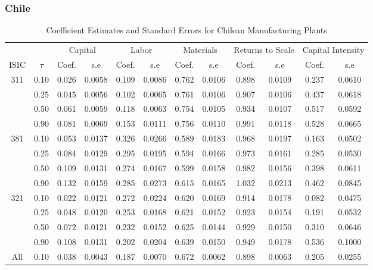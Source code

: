 \documentclass[11pt]{article}
\begin{document}
\subsubsection{Chile}

\begin{table}[H]
\centering
\caption{Coefficient Estimates and Standard Errors for Chilean Manufacturing Plants}
\begin{tabular}{cccccccccccc}
  \hline\hline & & \multicolumn{2}{c}{Capital}  & \multicolumn{2}{c}{Labor} & \multicolumn{2}{c}{Materials} & \multicolumn{2}{c}{Returns to Scale} & \multicolumn{2}{c}{Capital Intensity}\\ \cmidrule(lr){3-4} \cmidrule(lr){5-6} \cmidrule(lr){7-8} \cmidrule(lr){9-10} \cmidrule(lr){11-12}ISIC & $\tau$ & Coef. & s.e & Coef. & s.e & Coef. & s.e & Coef. & s.e & Coef. & s.e \\ 
  \hline
311 & 0.10 & 0.026 & 0.0058 & 0.109 & 0.0086 & 0.762 & 0.0106 & 0.898 & 0.0109 & 0.237 & 0.0610 \\ 
   & 0.25 & 0.045 & 0.0056 & 0.102 & 0.0065 & 0.761 & 0.0106 & 0.907 & 0.0106 & 0.437 & 0.0618 \\ 
   & 0.50 & 0.061 & 0.0059 & 0.118 & 0.0063 & 0.754 & 0.0105 & 0.934 & 0.0107 & 0.517 & 0.0592 \\ 
   & 0.90 & 0.081 & 0.0069 & 0.153 & 0.0111 & 0.756 & 0.0110 & 0.991 & 0.0118 & 0.528 & 0.0665 \\ 
  381 & 0.10 & 0.053 & 0.0137 & 0.326 & 0.0266 & 0.589 & 0.0183 & 0.968 & 0.0197 & 0.163 & 0.0502 \\ 
   & 0.25 & 0.084 & 0.0129 & 0.295 & 0.0195 & 0.594 & 0.0166 & 0.973 & 0.0161 & 0.285 & 0.0530 \\ 
   & 0.50 & 0.109 & 0.0131 & 0.274 & 0.0167 & 0.599 & 0.0158 & 0.982 & 0.0156 & 0.398 & 0.0611 \\ 
   & 0.90 & 0.132 & 0.0159 & 0.285 & 0.0273 & 0.615 & 0.0165 & 1.032 & 0.0213 & 0.462 & 0.0845 \\ 
  321 & 0.10 & 0.022 & 0.0121 & 0.272 & 0.0224 & 0.620 & 0.0169 & 0.914 & 0.0178 & 0.082 & 0.0475 \\ 
   & 0.25 & 0.048 & 0.0120 & 0.253 & 0.0168 & 0.621 & 0.0152 & 0.923 & 0.0154 & 0.191 & 0.0532 \\ 
   & 0.50 & 0.072 & 0.0121 & 0.232 & 0.0152 & 0.625 & 0.0144 & 0.929 & 0.0150 & 0.310 & 0.0646 \\ 
   & 0.90 & 0.108 & 0.0131 & 0.202 & 0.0204 & 0.639 & 0.0150 & 0.949 & 0.0178 & 0.536 & 0.1000 \\ 
  All & 0.10 & 0.038 & 0.0043 & 0.187 & 0.0070 & 0.672 & 0.0062 & 0.898 & 0.0063 & 0.205 & 0.0255 \\ 

\end{tabular}
\end{table}
\end{document}
